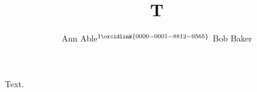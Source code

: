 \documentclass{article}
\begin{document}
\title{T}
\author{Ann Able$^{1\orcidlink{0000-0001-8812-0565}}$ \quad Bob Baker}
\maketitle
Text.
\end{document}
